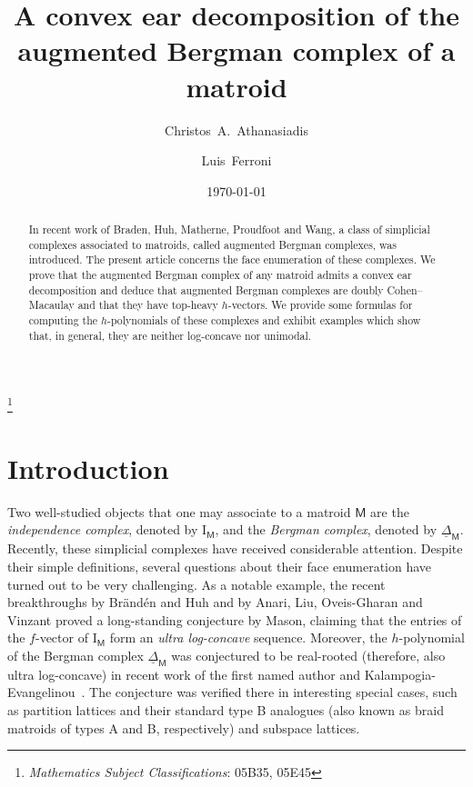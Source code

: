 \documentclass[11pt]{amsart}
\theoremstyle{theorems}
\theoremstyle{definition}
\newcommand{\M}{{\mathsf{M}}}
\newcommand{\I}{{\mathrm{I}}}
\newcommand{\uDelta}{\underline{\Delta}}
\begin{document}
\title[Decompositions of augmented Bergman complexes]
{A convex ear decomposition of the augmented Bergman 
complex of a matroid}

\author{Christos~A.~Athanasiadis}
\address{Department of Mathematics\\
National and Kapodistrian University of Athens\\
Panepistimioupolis\\ 15784 Athens, Greece}

\author{Luis~Ferroni}
\address{Department of Mathematics, University of Pisa, Pisa, Italy}

\date{\today}
\thanks{\textit{Mathematics Subject Classifications}: 05B35, 05E45}


\begin{abstract}
In recent work of Braden, Huh, Matherne, Proudfoot and Wang, a class of 
simplicial complexes associated to matroids, called augmented Bergman 
complexes, was introduced. The present article concerns the face 
enumeration of these complexes. We 
prove that the augmented Bergman complex of any matroid admits a convex 
ear decomposition and deduce that augmented Bergman complexes are doubly 
Cohen--Macaulay and that they have top-heavy $h$-vectors. We provide some 
formulas for computing the $h$-polynomials of these complexes and exhibit 
examples which show that, in general, they are neither log-concave 
nor unimodal. 
\end{abstract}

\maketitle

\section{Introduction}
\label{sec:intro}

Two well-studied objects that one may associate to a matroid $\M$ are the 
\emph{independence complex}, denoted by $\I_{\M}$, and the \emph{Bergman 
complex}, denoted by $\uDelta_{\M}$. Recently, these simplicial complexes 
have received considerable attention. Despite their simple definitions, 
several questions about their face enumeration have turned out to be very 
challenging. As a notable example, the recent breakthroughs by Br\"and\'en 
and Huh \cite{BH20} and by Anari, Liu, Oveis-Gharan and Vinzant 
\cite{ALOV24} proved a long-standing conjecture by Mason, claiming that 
the entries of the $f$-vector of $\I_{\M}$ form an \emph{ultra 
log-concave} sequence. Moreover, the $h$-polynomial of the Bergman complex 
$\uDelta_{\M}$ was conjectured to be real-rooted (therefore, also ultra 
log-concave) in recent work of the first named author and 
Kalampogia-Evangelinou~\cite{AK23}. The conjecture was verified there
in interesting special cases, such as partition lattices and their 
standard type B analogues (also known as braid matroids of types A and B,
respectively) and subspace lattices.
\end{document}
